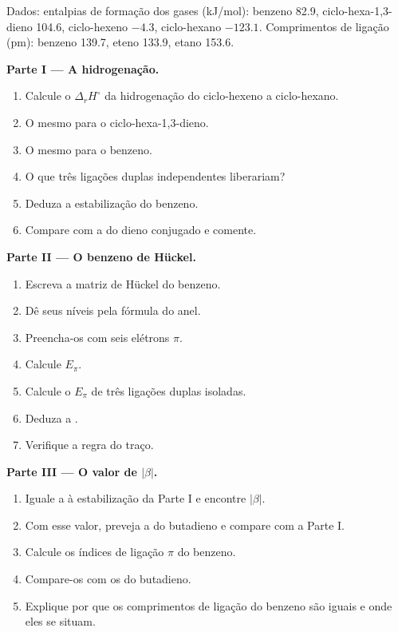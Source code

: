 \begin{problem}
\label{pb:b2:huckel:1}
Dados: entalpias de formação dos gases (\unit{kJ/mol}): benzeno 82.9,
ciclo-hexa-1,3-dieno 104.6, ciclo-hexeno $-4.3$, ciclo-hexano $-123.1$.
Comprimentos de ligação (pm): benzeno 139.7, eteno 133.9, etano 153.6.

\medskip
\noindent\textbf{Parte I --- A hidrogenação.}
\begin{enumerate}
  \item Calcule o $\Delta_r H^\circ$ da hidrogenação do ciclo-hexeno a ciclo-hexano.
  \item O mesmo para o ciclo-hexa-1,3-dieno.
  \item O mesmo para o benzeno.
  \item O que três ligações duplas independentes liberariam?
  \item Deduza a estabilização do benzeno.
  \item Compare com a do dieno conjugado e comente.
\end{enumerate}

\medskip
\noindent\textbf{Parte II --- O benzeno de Hückel.}
\begin{enumerate}[resume]
  \item Escreva a matriz de Hückel do benzeno.
  \item Dê seus níveis pela fórmula do anel.
  \item Preencha-os com seis elétrons $\pi$.
  \item Calcule $E_\pi$.
  \item Calcule o $E_\pi$ de três ligações duplas isoladas.
  \item Deduza a .
  \item Verifique a regra do traço.
\end{enumerate}

\medskip
\noindent\textbf{Parte III --- O valor de $|\beta|$.}
\begin{enumerate}[resume]
  \item Iguale a  à estabilização da Parte I e encontre
        $|\beta|$.
  \item Com esse valor, preveja a  do butadieno e
        compare com a Parte I.
  \item Calcule os índices de ligação $\pi$ do benzeno.
  \item Compare-os com os do butadieno.
  \item Explique por que os comprimentos de ligação do benzeno são iguais e
        onde eles se situam.
\end{enumerate}


\end{problem}
